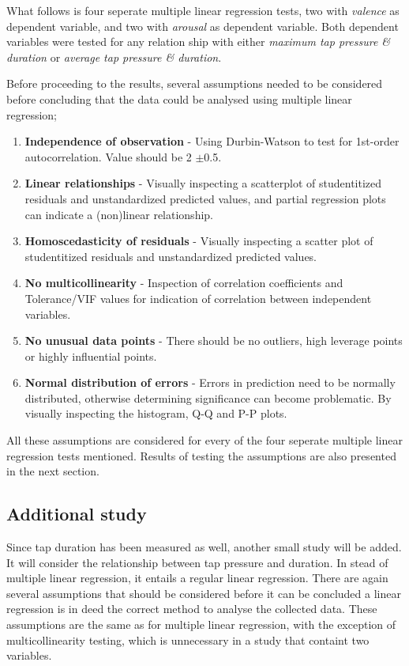 \documentclass{sigchi}
\begin{document}
What follows is four seperate multiple linear regression tests, two with \textit{valence} as dependent variable, and two with \textit{arousal} as dependent variable. Both dependent variables were tested for any relation ship with either \textit{maximum tap pressure \& duration} or \textit{average tap pressure \& duration}.

Before proceeding to the results, several assumptions needed to be considered before concluding that the data could be analysed using multiple linear regression;
\begin{enumerate}
  \item \textbf{Independence of observation} - Using Durbin-Watson to test for 1st-order autocorrelation. Value should be 2 $\pm$0.5.
  \item \textbf{Linear relationships} - Visually inspecting a scatterplot of studentitized residuals and unstandardized predicted values, and partial regression plots can indicate a (non)linear relationship.
  \item \textbf{Homoscedasticity of residuals} - Visually inspecting a scatter plot of studentitized residuals and unstandardized predicted values.
  \item \textbf{No multicollinearity} - Inspection of correlation coefficients and Tolerance/VIF values for indication of correlation between independent variables.
  \item \textbf{No unusual data points} - There should be no outliers, high leverage points or highly influential points.
  \item \textbf{Normal distribution of errors} - Errors in prediction need to be normally distributed, otherwise determining significance can become problematic. By visually inspecting the histogram, Q-Q and P-P plots.
\end{enumerate}
All these assumptions are considered for every of the four seperate multiple linear regression tests mentioned. Results of testing the assumptions are also presented in the next section.


\subsection{Additional study} %
\label{sub:additional_study}
Since tap duration has been measured as well, another small study will be added. It will consider the relationship between tap pressure and duration. In stead of multiple linear regression, it entails a regular linear regression. There are again several assumptions that should be considered before it can be concluded a linear regression is in deed the correct method to analyse the collected data. These assumptions are the same as for multiple linear regression, with the exception of multicollinearity testing, which is unnecessary in a study that containt two variables.
\end{document}
